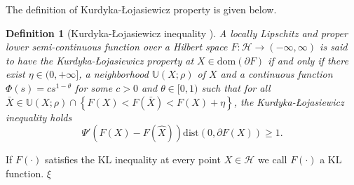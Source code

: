 \documentclass[twoside,11pt]{article}
\newtheorem{Def}{Definition}
\numberwithin{equation}{section}
\begin{document}
The definition of Kurdyka-Łojasiewicz property is given below.
\begin{Def}[Kurdyka-{\L}ojasiewicz inequality \cite{KL_definition_Hilbert}]\label{def_KL_fun}
A locally Lipschitz and proper lower semi-continuous function over a  Hilbert space $F:\mathcal{H} \to (-\infty,\infty) $ is said to have the Kurdyka-{\L}ojasiewicz property at $X\in\mathrm{dom}(\partial F) $ if and only if there exist $\eta\in (0,+\infty] $, a neighborhood $\mathbb{U} (X;\rho) $ of $X$ and a continuous function $\Phi(s) = cs^{1-\theta} $ for some $c>0$ and $\theta\in[0,1)$ such that 
  for all $\bar{X}\in\mathbb{U} (X;\rho)\cap\left\{F(X)<F(\bar{X})<F (X)+\eta\right\} $, the Kurdyka-{\L}ojasiewicz inequality holds
    \begin{equation}\label{ineq_KL}
      \Psi{'} \left(F (X)-F (\hat{X})\right) \mathrm{dist} \left(0,\partial F (X)\right)\ge 1.
    \end{equation}
 \end{Def}
If $F (\cdot) $ satisfies the KL inequality at every point $X\in\mathcal{H} $ we call $F (\cdot) $ a KL function.
$\xi$











\end{document}
